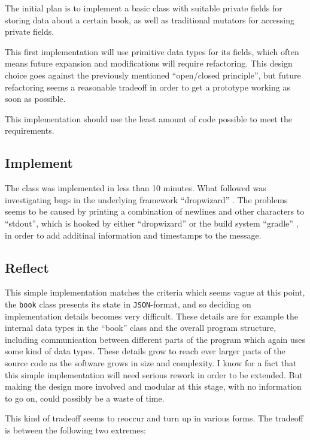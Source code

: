 The initial plan is to implement a basic class with suitable private fields for
storing data about a certain book, as well as traditional mutators for
accessing private fields. 

This first implementation will use primitive data types for its fields, which
often means future expansion and modifications will require refactoring. 
This design choice goes against the previously mentioned ``open/closed
principle'', but future refactoring seems a reasonable tradeoff in order to get
a prototype working as soon as possible.

This implementation should use the least amount of code possible to meet the
requirements.


\subsection{Implement}\label{task-1a-implement}
The class was implemented in less than 10 minutes. What followed was
investigating bugs in the underlying framework ``dropwizard''
\cite{framework:dropwizard}.  The problems seems to be caused by printing a
combination of newlines and other characters to ``stdout'', which is hooked by
either ``dropwizard'' or the build system ``gradle'' \cite{tool:gradle}, in
order to add additinal information and timestamps to the message.


\subsection{Reflect}\label{task-1a-reflect}
This simple implementation matches the criteria which seems vague at this point,
the \texttt{book} class presents its state in \texttt{JSON}-format, and so deciding on
implementation details becomes very difficult. These details are for example
the internal data types in the ``book'' class and the overall program
structure, including communication between different parts of the program which
again uses some kind of data types.
These details grow to reach ever larger parts of the source code as the software
grows in size and complexity.
I know for a fact that this simple implementation will need serious rework 
in order to be extended. But making the design more involved and modular
at this stage, with no information to go on, could possibly be a waste of time.

This kind of tradeoff seems to reoccur and turn up in various forms. 
The tradeoff is between the following two extremes:

